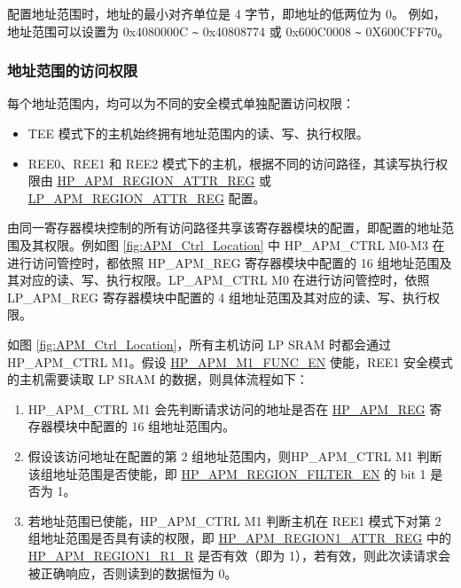 \documentclass[main\_\_CN.tex]{subfiles}
\begin{document}
配置地址范围时，地址的最小对齐单位是 4 字节，即地址的低两位为 0。 例如，地址范围可以设置为 0x4080000C \verb+~+ 0x40808774 或 0x600C0008 \verb+~+ 0X600CFF70。

\subsubsection{地址范围的访问权限}

每个地址范围内，均可以为不同的安全模式单独配置访问权限：

\begin{itemize}

    \item TEE 模式下的主机始终拥有地址范围内的读、写、执行权限。
    \item REE0、REE1 和 REE2 模式下的主机，根据不同的访问路径，其读写执行权限由 \hyperref[regdesc:HPAPMREGION0ATTRREG]{HP\_APM\_REGION\_ATTR\_REG} 或 \hyperref[regdesc:LPAPMREGION0ATTRREG]{LP\_APM\_REGION\_ATTR\_REG} 配置。

\end{itemize}

由同一寄存器模块控制的所有访问路径共享该寄存器模块的配置，即配置的地址范围及其权限。例如图 \ref{fig:APM_Ctrl_Location} 中 HP\_APM\_CTRL M0-M3 在进行访问管控时，都依照 HP\_APM\_REG 寄存器模块中配置的 16 组地址范围及其对应的读、写、执行权限。LP\_APM\_CTRL M0 在进行访问管控时，依照 LP\_APM\_REG 寄存器模块中配置的 4 组地址范围及其对应的读、写、执行权限。

如图 \ref{fig:APM_Ctrl_Location}，所有主机访问 LP SRAM 时都会通过 HP\_APM\_CTRL M1。假设 \hyperref[fielddesc:HPAPMM1FUNCEN]{HP\_APM\_M1\_FUNC\_EN} 使能，REE1 安全模式的主机需要读取 LP SRAM 的数据，则具体流程如下：


\begin{enumerate}
    \item HP\_APM\_CTRL M1 会先判断请求访问的地址是否在 \hyperref[sec:permctrl-reg-hp]{HP\_APM\_REG} 寄存器模块中配置的 16 组地址范围内。
    \item 假设该访问地址在配置的第 2 组地址范围内，则HP\_APM\_CTRL M1 判断该组地址范围是否使能，即 \hyperref[fielddesc:HPAPMREGIONFILTEREN]{HP\_APM\_REGION\_FILTER\_EN} 的 bit 1 是否为 1。
    \item 若地址范围已使能，HP\_APM\_CTRL M1 判断主机在 REE1 模式下对第 2 组地址范围是否具有读的权限，即  \hyperref[regdesc:HPAPMREGION0ATTRREG]{HP\_APM\_REGION1\_ATTR\_REG}  中的 \hyperref[fielddesc:HPAPMREGION0R1R]{HP\_APM\_REGION1\_R1\_R} 是否有效（即为 1），若有效，则此次读请求会被正确响应，否则读到的数据恒为 0。
\end{enumerate}
\end{document}

